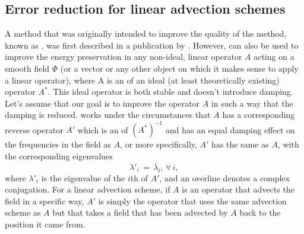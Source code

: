 \subsection{Error reduction for linear advection schemes}

A method that was originally intended to improve the quality of the \LS method, known as \BFECC, was first described in a publication by \citet{Dupont2003}. However, \BFECC can also be used to improve the energy preservation in any non-ideal, linear operator $A$ acting on a smooth field $\Phi$ (or a vector or any other object on which it makes sense to apply a linear operator), where A is an \approximation of an ideal (at least theoretically existing) operator $A^*$. This ideal operator is both stable and doesn't introduce damping. Let's assume that our goal is to improve the operator $A$ in such a way that the damping is reduced. \BFECC works under the circumstances that $A$ has a corresponding reverse operator $A'$ which is an \approximation of $(A^*)^{-1}$ and has an equal damping effect on the frequencies in the field as $A$, or more specifically, $A'$ has the same \eigenfunctions as $A$, with the corresponding eigenvalues
%
\begin{equation}
\lambda'_i \,=\, \overline{\lambda_i}, \,\forall\,i,
\end{equation}
%
where $\lambda'_i$ is the eigenvalue of the $i$th \eigenfunction of $A'$, and an overline denotes a complex conjugation. For a linear advection scheme, if $A$ is an operator that advects the field in a specific way, $A'$ is simply the operator that uses the same advection scheme as $A$ but that takes a field that has been advected by $A$ back to the position it came from.

